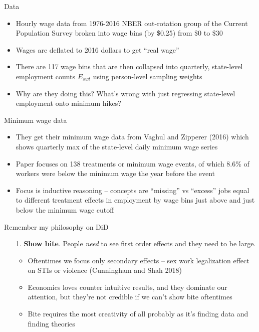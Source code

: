 \documentclass{beamer}
\begin{document}
\begin{frame}{Data}

\begin{itemize}
\item Hourly wage data from 1976-2016 NBER out-rotation group of the Current Population Survey broken into wage bins (by \$0.25) from \$0 to \$30
\item Wages are deflated to 2016 dollars to get ``real wage''
\item There are 117 wage bins that are then collapsed into quarterly, state-level employment counts $E_{swt}$ using person-level sampling weights
\item Why are they doing this? What's wrong with just regressing state-level employment onto minimum hikes?
\end{itemize}

\end{frame}

\begin{frame}{Minimum wage data}

\begin{itemize}
\item They get their minimum wage data from Vaghul and Zipperer (2016) which shows quarterly max of the state-level daily minimum wage series 
\item Paper focuses on 138 treatments or minimum wage events, of which 8.6\% of workers were below the minimum wage the year before the event
\item Focus is inductive reasoning -- concepts are ``missing'' vs ``excess'' jobs equal to different treatment effects in employment by wage bins just above and just below the minimum wage cutoff
\end{itemize}

\end{frame}

\begin{frame}{Remember my philosophy on DiD}

\begin{enumerate}
\item[1. ] \textbf{Show bite}. People \emph{need} to see first order effects and they need to be large.  
	\begin{itemize}
	\item Oftentimes we focus only secondary effects -- sex work legalization effect on STIs or violence (Cunningham and Shah 2018) 
	\item Economics loves counter intuitive results, and they dominate our attention, but they're not credible if we can't show bite oftentimes
	\item Bite requires the most creativity of all probably as it's finding data and finding theories
	\end{itemize}
\end{enumerate}

\end{frame}
\end{document}
